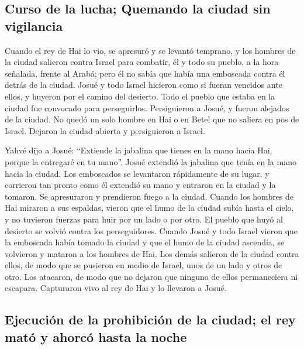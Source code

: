 \begin{paracol}{2}
\hypertarget{curso-de-la-lucha-quemando-la-ciudad-sin-vigilancia}{%
\subsection{Curso de la lucha; Quemando la ciudad sin
vigilancia}\label{curso-de-la-lucha-quemando-la-ciudad-sin-vigilancia}}

 Cuando el rey de Hai lo vio, se apresuró y se levantó
temprano, y los hombres de la ciudad salieron contra Israel para
combatir, él y todo su pueblo, a la hora señalada, frente al Arabá; pero
él no sabía que había una emboscada contra él detrás de la ciudad.
 Josué y todo Israel hicieron como si fueran vencidos
ante ellos, y huyeron por el camino del desierto.  Todo
el pueblo que estaba en la ciudad fue convocado para perseguirlos.
Persiguieron a Josué, y fueron alejados de la ciudad.  No
quedó un solo hombre en Hai o en Betel que no saliera en pos de Israel.
Dejaron la ciudad abierta y persiguieron a Israel.

 Yahvé dijo a Josué: ``Extiende la jabalina que tienes en
la mano hacia Hai, porque la entregaré en tu mano''. Josué extendió la
jabalina que tenía en la mano hacia la ciudad.  Los
emboscados se levantaron rápidamente de su lugar, y corrieron tan pronto
como él extendió su mano y entraron en la ciudad y la tomaron. Se
apresuraron y prendieron fuego a la ciudad.  Cuando los
hombres de Hai miraron a sus espaldas, vieron que el humo de la ciudad
subía hasta el cielo, y no tuvieron fuerzas para huir por un lado o por
otro. El pueblo que huyó al desierto se volvió contra los perseguidores.
 Cuando Josué y todo Israel vieron que la emboscada había
tomado la ciudad y que el humo de la ciudad ascendía, se volvieron y
mataron a los hombres de Hai.  Los demás salieron de la
ciudad contra ellos, de modo que se pusieron en medio de Israel, unos de
un lado y otros de otro. Los atacaron, de modo que no dejaron que
ninguno de ellos permaneciera ni escapara.  Capturaron
vivo al rey de Hai y lo llevaron a Josué.

\hypertarget{ejecuciuxf3n-de-la-prohibiciuxf3n-de-la-ciudad-el-rey-matuxf3-y-ahorcuxf3-hasta-la-noche}{%
\subsection{Ejecución de la prohibición de la ciudad; el rey mató y
ahorcó hasta la
noche}\label{ejecuciuxf3n-de-la-prohibiciuxf3n-de-la-ciudad-el-rey-matuxf3-y-ahorcuxf3-hasta-la-noche}}


\end{paracol}
